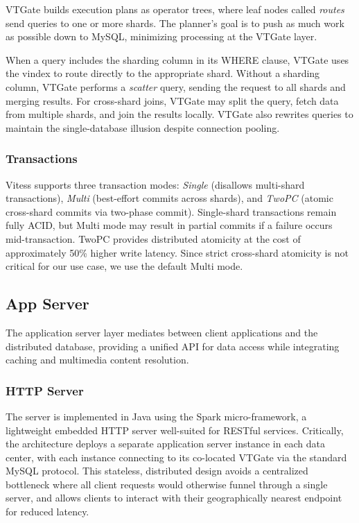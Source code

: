 \documentclass{article}
\begin{document}
VTGate builds execution plans as operator trees, where leaf nodes called \emph{routes} send queries to one or more shards. The planner's goal is to push as much work as possible down to MySQL, minimizing processing at the VTGate layer.

When a query includes the sharding column in its WHERE clause, VTGate uses the vindex to route directly to the appropriate shard. Without a sharding column, VTGate performs a \emph{scatter} query, sending the request to all shards and merging results. For cross-shard joins, VTGate may split the query, fetch data from multiple shards, and join the results locally. VTGate also rewrites queries to maintain the single-database illusion despite connection pooling. 

\subsubsection{Transactions}

Vitess supports three transaction modes: \emph{Single} (disallows multi-shard transactions), \emph{Multi} (best-effort commits across shards), and \emph{TwoPC} (atomic cross-shard commits via two-phase commit). Single-shard transactions remain fully ACID, but Multi mode may result in partial commits if a failure occurs mid-transaction. TwoPC provides distributed atomicity at the cost of approximately 50\% higher write latency. Since strict cross-shard atomicity is not critical for our use case, we use the default Multi mode.

\subsection{App Server}

The application server layer mediates between client applications and the distributed database, providing a unified API for data access while integrating caching and multimedia content resolution.

\subsubsection{HTTP Server}

The server is implemented in Java using the Spark micro-framework, a lightweight embedded HTTP server well-suited for RESTful services. Critically, the architecture deploys a separate application server instance in each data center, with each instance connecting to its co-located VTGate via the standard MySQL protocol. This stateless, distributed design avoids a centralized bottleneck where all client requests would otherwise funnel through a single server, and allows clients to interact with their geographically nearest endpoint for reduced latency.
\end{document}
